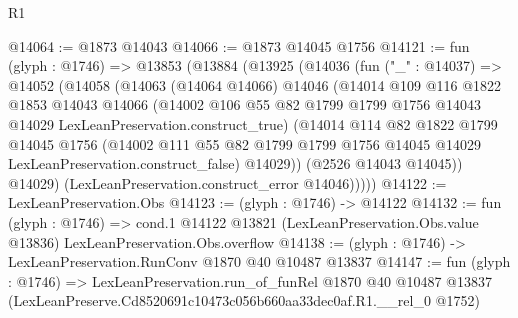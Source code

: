 \begin{lexlean}{R1}
\begin{coremodule}
@14064 := @1873 @14043
@14066 := @1873 @14045 @1756
@14121 := fun (glyph : @1746) =>
  @13853
    (@13884
      (@13925
        (@14036
          (fun ("_" : @14037) =>
          @14052
            (@14058
              (@14063
                (@14064 @14066)
                @14046
                (@14014
                  @109
                  @116
                  @1822
                  @1853
                  @14043
                  @14066
                  (@14002
                    @106
                    @55
                    @82
                    @1799
                    @1799
                    @1756
                    @14043
                    @14029
                    LexLeanPreservation.construct_true)
                  (@14014
                    @114
                    @82
                    @1822
                    @1799
                    @14045
                    @1756
                    (@14002
                      @111
                      @55
                      @82
                      @1799
                      @1799
                      @1756
                      @14045
                      @14029
                      LexLeanPreservation.construct_false)
                    @14029))
                (@2526 @14043 @14045))
              @14029)
            (LexLeanPreservation.construct_error @14046)))))
@14122 := LexLeanPreservation.Obs
@14123 := (glyph : @1746) -> @14122
@14132 := fun (glyph : @1746) =>
  cond.{1} @14122 @13821 (LexLeanPreservation.Obs.value @13836) LexLeanPreservation.Obs.overflow
@14138 := (glyph : @1746) -> LexLeanPreservation.RunConv @1870 @40 @10487 @13837
@14147 := fun (glyph : @1746) =>
  LexLeanPreservation.run_of_funRel
    @1870
    @40
    @10487
    @13837
    (LexLeanPreserve.Cd8520691c10473c056b660aa33dec0af.R1.__rel_0 @1752)
\end{coremodule}
\end{lexlean}
